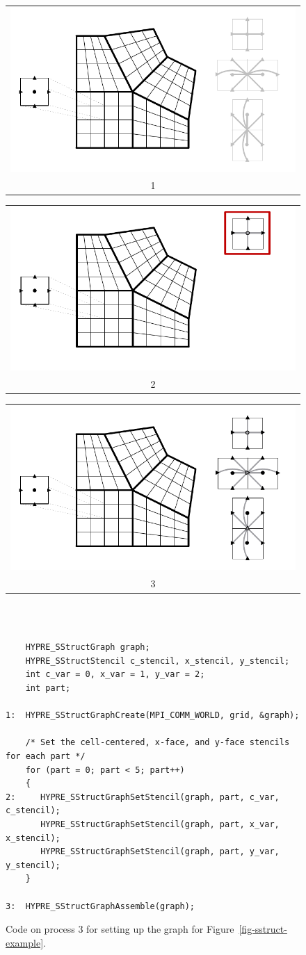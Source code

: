 \begin{figure}
\centering
\begin{tabular}{@{}c@{}}
\includegraphics[width=.32\textwidth]{figSStructGraph1}\vspace{-.5em} \\ 1
\end{tabular}
\hfill
\begin{tabular}{@{}c@{}}
\includegraphics[width=.32\textwidth]{figSStructGraph2}\vspace{-.5em} \\ 2
\end{tabular}
\hfill
\begin{tabular}{@{}c@{}}
\includegraphics[width=.32\textwidth]{figSStructGraph5}\vspace{-.5em} \\ 3
\end{tabular}
\vspace{1em} \\
\begin{minipage}{0.9\textwidth}
\begin{verbatim}
    
    HYPRE_SStructGraph graph;
    HYPRE_SStructStencil c_stencil, x_stencil, y_stencil;
    int c_var = 0, x_var = 1, y_var = 2;
    int part;
    
1:  HYPRE_SStructGraphCreate(MPI_COMM_WORLD, grid, &graph);
    
    /* Set the cell-centered, x-face, and y-face stencils for each part */
    for (part = 0; part < 5; part++)
    {
2:     HYPRE_SStructGraphSetStencil(graph, part, c_var, c_stencil);
       HYPRE_SStructGraphSetStencil(graph, part, x_var, x_stencil);
       HYPRE_SStructGraphSetStencil(graph, part, y_var, y_stencil);
    }
    
3:  HYPRE_SStructGraphAssemble(graph);

\end{verbatim}
\end{minipage}
\caption{%
Code on process 3 for setting up the graph for Figure~\ref{fig-sstruct-example}.}
\label{fig-sstruct-graph}
\end{figure}


